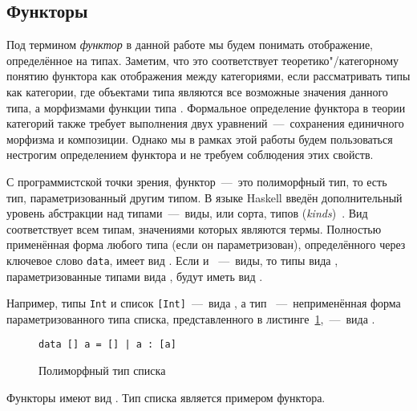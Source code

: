 \subsection{Функторы}

Под термином \emph{функтор} в данной работе мы будем понимать
отображение, определённое на типах. Заметим, что это соответствует
теоретико"/категорному понятию функтора как отображения между
категориями, если рассматривать типы как категории, где объектами
типа  являются все возможные значения данного типа, а
морфизмами функции типа . Формальное
определение функтора в теории категорий также требует выполнения
двух уравнений~---~сохранения единичного морфизма и композиции.
Однако мы в рамках этой работы будем пользоваться нестрогим
определением функтора и не требуем соблюдения этих свойств.

С программистской точки зрения, функтор~---~это полиморфный тип,
то есть тип, параметризованный другим типом. В языке Haskell введён
дополнительный уровень абстракции над типами~---~виды, или сорта,
типов (\textsl{kinds})~\cite{Loh2015}. Вид \texttts{*} соответствует
всем типам, значениями которых являются термы. Полностью
применённая форма любого типа (если он параметризован),
определённого через ключевое слово \lstinline{data}, имеет вид
\texttts{*}. Если  и ~---~виды, то типы вида
, параметризованные типами вида , будут иметь вид
.

Например, типы \lstinline{Int} и список \lstinline{[Int]}~---~вида
\texttts{*}, а тип \texttts{[]}~---~неприменённая форма
параметризованного типа списка, представленного в
листинге~\ref{list:list},~---~вида .
\begin{figure}[h]
\begin{framed}
\lstinline{data [] a = [] | a : [a]}
\end{framed}
\caption{Полиморфный тип списка}
\label{list:list}
\end{figure}

Функторы имеют вид . Тип списка является примером
функтора.

